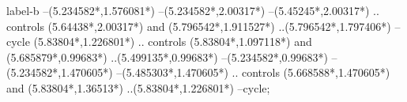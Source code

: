 {\begin{scope}[x=1mm,y=1mm,line width=\SCstroke mm,line cap=round,line join=round]
\begin{SCpart}{label-b}
--({5.234582*\SCF},{1.576081*\SCF})
--({5.234582*\SCF},{2.00317*\SCF})
--({5.45245*\SCF},{2.00317*\SCF})
.. controls ({5.64438*\SCF},{2.00317*\SCF}) and ({5.796542*\SCF},{1.911527*\SCF}) ..({5.796542*\SCF},{1.797406*\SCF})
--cycle
({5.83804*\SCF},{1.226801*\SCF})
.. controls ({5.83804*\SCF},{1.097118*\SCF}) and ({5.685879*\SCF},{0.99683*\SCF}) ..({5.499135*\SCF},{0.99683*\SCF})
--({5.234582*\SCF},{0.99683*\SCF})
--({5.234582*\SCF},{1.470605*\SCF})
--({5.485303*\SCF},{1.470605*\SCF})
.. controls ({5.668588*\SCF},{1.470605*\SCF}) and ({5.83804*\SCF},{1.36513*\SCF}) ..({5.83804*\SCF},{1.226801*\SCF})
--cycle;
\end{SCpart}
\end{scope}
}
